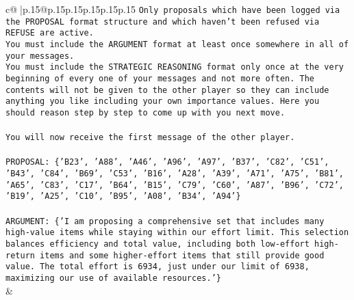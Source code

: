 \documentclass{article}
\begin{document}
{\begin{supertabular}{c@{$\;$}|p{.15\linewidth}@{}p{.15\linewidth}p{.15\linewidth}p{.15\linewidth}p{.15\linewidth}p{.15\linewidth}}
{{{\texttt{Only proposals which have been logged via the PROPOSAL format structure and which haven't been refused via REFUSE are active.} \\
\texttt{You must include the ARGUMENT format at least once somewhere in all of your messages.} \\
\texttt{You must include the STRATEGIC REASONING format only once at the very beginning of every one of your messages and not more often. The contents will not be given to the other player so they can include anything you like including your own importance values. Here you should reason step by step to come up with you next move.} \\
\\ 
\texttt{You will now receive the first message of the other player.} \\
\\ 
\texttt{PROPOSAL: \{'B23', 'A88', 'A46', 'A96', 'A97', 'B37', 'C82', 'C51', 'B43', 'C84', 'B69', 'C53', 'B16', 'A28', 'A39', 'A71', 'A75', 'B81', 'A65', 'C83', 'C17', 'B64', 'B15', 'C79', 'C60', 'A87', 'B96', 'C72', 'B19', 'A25', 'C10', 'B95', 'A08', 'B34', 'A94'\}} \\
\\ 
\texttt{ARGUMENT: \{'I am proposing a comprehensive set that includes many high{-}value items while staying within our effort limit. This selection balances efficiency and total value, including both low{-}effort high{-}return items and some higher{-}effort items that still provide good value. The total effort is 6934, just under our limit of 6938, maximizing our use of available resources.'\}} \\
            }
        }
    }
    & \\ \\


\end{supertabular}}
\end{document}
